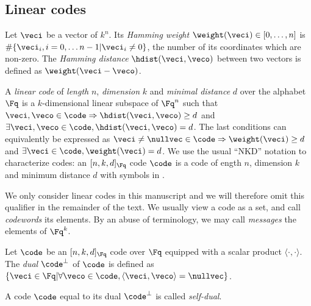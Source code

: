 
\subsection{Linear codes}

\begin{defi}
Let $\veci$ be a vector of $k^n$. Its \emph{Hamming weight} $\weight(\veci) \in [0,\ldots,n]$ is $\#\{\veci_i, i = 0,\ldots n-1| \veci_i \neq 0\}$,
the number of its coordinates which are non-zero.
The \emph{Hamming distance} $\hdist(\veci,\veco)$ between two vectors is defined as $\weight(\veci - \veco)$.
\end{defi}


\begin{defi}
\label{def:lincode}
A \emph{linear code} of \emph{length} $n$, \emph{dimension} $k$ and \emph{minimal distance} $d$ over the alphabet $\Fq$ is a $k$-dimensional linear subspace of $\Fq^n$ such that $\veci, \veco \in \code \Rightarrow \hdist(\veci, \veco) \geq d$
and $\exists \veci, \veco \in \code,  \hdist(\veci, \veco) = d$.
The last conditions can equivalently be expressed as $\veci \neq \nullvec \in \code \Rightarrow \weight(\veci) \geq d$ and $\exists \veci \in \code, \weight(\veci) = d$.
We use the usual ``NKD'' notation to characterize codes: an $[n, k, d]_{\Fq}$ code $\code$ is a code of ength $n$, dimension $k$ and minimum distance $d$
with symbols in \Fq.
\end{defi}

We only consider linear codes in this manuscript and we will therefore omit this qualifier in the remainder of the text. 
We usually view a code as a set, and call \emph{codewords} its elements. By an abuse of terminology, we may call \emph{messages} the elements of $\Fq^k$.

\begin{defi}
Let $\code$ be an $[n, k, d]_{\Fq}$ code over $\Fq$ equipped with a scalar product $\langle\cdot,\cdot\rangle$. The \emph{dual}
$\code^\bot$ of $\code$ is defined as $\{\veci \in \Fq | \forall \veco \in \code, \langle\veci,\veco\rangle = \nullvec\}$.
\end{defi}

A code $\code$ equal to its dual $\code^\bot$ is called \emph{self-dual}.


